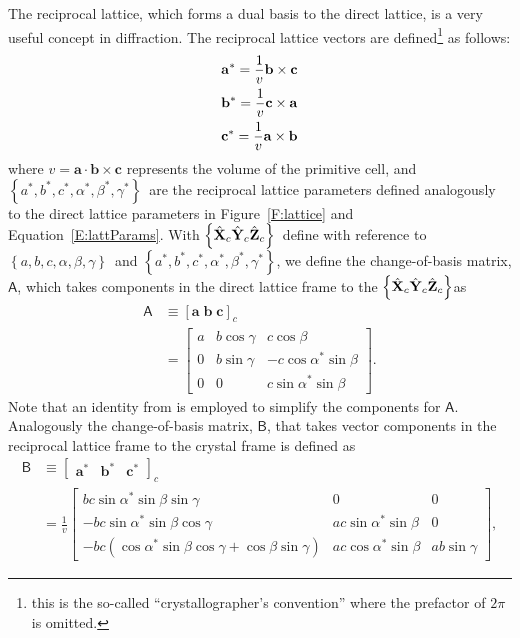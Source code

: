 \documentclass[12pt,letterpaper,final]{amsart}
\newcommand{\mbm}[1]{\ensuremath{\mbox{\boldmath$#1$}}}
\newcommand{\amat}{\ensuremath{\mathsf{A}}}
\newcommand{\bmat}{\ensuremath{\mathsf{B}}}
\newcommand{\Xc}{\ensuremath{\hat{\mbm{\mathrm{X}}}_c}}
\newcommand{\Yc}{\ensuremath{\hat{\mbm{\mathrm{Y}}}_c}}
\newcommand{\Zc}{\ensuremath{\hat{\mbm{\mathrm{Z}}}_c}}
\newcommand{\crysframe}{\ensuremath{\left\{\Xc\Yc\Zc\right\}}}
\newcommand{\cryscomps}[1]{\left[#1\right]_c}
\newcommand{\figref}[1]{Figure~\ref{#1}}
\newcommand{\eqnref}[1]{Equation~\ref{#1}}
\newcommand{\cella}{\ensuremath{\mathbf{a}}}
\newcommand{\cellb}{\ensuremath{\mathbf{b}}}
\newcommand{\cellc}{\ensuremath{\mathbf{c}}}
\newcommand{\dalfa}{\ensuremath{\alpha}}
\newcommand{\dbeta}{\ensuremath{\beta}}
\newcommand{\dgama}{\ensuremath{\gamma}}
\newcommand{\cellParams}{\ensuremath{\left\{ a,b,c,\dalfa,\dbeta,\dgama \right\}}}
\newcommand{\rcella}{\ensuremath{\mathbf{a}^*}}
\newcommand{\rcellb}{\ensuremath{\mathbf{b}^*}}
\newcommand{\rcellc}{\ensuremath{\mathbf{c}^*}}
\newcommand{\ralfa}{\ensuremath{\alpha^*}}
\newcommand{\rbeta}{\ensuremath{\beta^*}}
\newcommand{\rgama}{\ensuremath{\gamma^*}}
\newcommand{\rcellParams}{\ensuremath{\left\{ a^*,b^*,c^*,\ralfa,\rbeta,\rgama \right\}}}
\newcommand{\cellVol}{\ensuremath{v}}
\newcommand{\cellVolExpr}{\ensuremath{\dotp{\cella}{\crossp{\cellb}{\cellc}}}}
\newcommand{\dotp}[2]{\ensuremath{#1\cdot#2}}
\newcommand{\crossp}[2]{\ensuremath{#1\times#2}}
\begin{document}
The reciprocal lattice, which forms a dual basis to the direct
lattice, is a very useful concept in diffraction.  The reciprocal
lattice vectors are defined\footnote{this is the so-called
``crystallographer's convention'' where the prefactor of $2\pi$ is
omitted.} as follows:
\begin{align}
  \rcella = {1 \over v}\crossp{\cellb}{\cellc}\\
  \rcellb = {1 \over v}\crossp{\cellc}{\cella}\\
  \rcellc = {1 \over v}\crossp{\cella}{\cellb}
\end{align}
where $\cellVol = \cellVolExpr$ represents the volume of the primitive
cell, and \rcellParams\ are the reciprocal lattice parameters defined
analogously to the direct lattice parameters in \figref{F:lattice} and
\eqnref{E:lattParams}.  With \crysframe\ define with reference to
\cellParams\ and \rcellParams, we define the change-of-basis matrix,
\amat, which takes components in the direct lattice frame to the
\crysframe as
\begin{align}
  \amat &\equiv \cryscomps{\cella\;\cellb\;\cellc} \label{E:amatrix}\\
        &= \begin{bmatrix}
              a & b\cos{\gamma} & c\cos{\beta} \\
              0 & b\sin{\gamma} & -c\cos{\alpha^*}\sin{\beta} \\
              0 & 0 & c\sin{\alpha^*}\sin{\beta}
           \end{bmatrix}. \nonumber
\end{align}
Note that an identity from \citet{Neustadt:a05876} is employed to
simplify the components for \amat.  Analogously the change-of-basis
matrix, \bmat, that takes vector components in the reciprocal lattice
frame to the crystal frame is defined as
\begin{align}
  \bmat &\equiv \cryscomps{\begin{matrix} \rcella & \rcellb & \rcellc \end{matrix}} \label{E:bmatrix}\\ 
        &= \frac{1}{\cellVol}\begin{bmatrix}
           bc\sin{\ralfa}\sin{\dbeta}\sin{\dgama} &                          0 &                                           0 \\
          -bc\sin{\ralfa}\sin{\dbeta}\cos{\dgama} & ac\sin{\ralfa}\sin{\dbeta} &                                           0 \\
          -bc(\cos{\ralfa}\sin{\dbeta}\cos{\dgama} + \cos{\dbeta}\sin{\dgama}) & ac\cos{\ralfa}\sin{\dbeta} & ab\sin{\dgama}
	\end{bmatrix}, \nonumber
\end{align}
\end{document}
